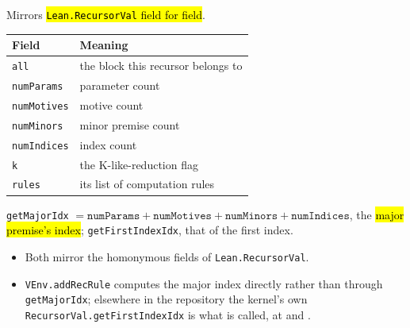 \begin{definition}
\label{struct:vrecursor}
\leanok
{} 

 Mirrors \hl{\texttt{Lean.RecursorVal} field for field}.
\par\smallskip\noindent
\begin{tabular}{ll}
\toprule
Field & Meaning \\
\midrule
\texttt{all} & the block this recursor belongs to \\
\texttt{numParams} & parameter count \\
\texttt{numMotives} & motive count \\
\texttt{numMinors} & minor premise count \\
\texttt{numIndices} & index count \\
\texttt{k} & the K-like-reduction flag \\
\texttt{rules} & its list of computation rules \\
\bottomrule
\end{tabular}\par\smallskip
\end{definition}

\begin{definition}
\label{def:getmajoridx}
\leanok
{} 

 \texttt{getMajorIdx} $= \texttt{numParams}+\texttt{numMotives}+\texttt{numMinors}+\texttt{numIndices}$,
the \hl{major premise's index}; \texttt{getFirstIndexIdx}, that of the first index.
\begin{itemize}
\item Both mirror the homonymous fields of \texttt{Lean.RecursorVal}.
\item \texttt{VEnv.addRecRule}  computes the
major index directly rather than through \texttt{getMajorIdx}; elsewhere in the
repository the kernel's own \texttt{RecursorVal.getFirstIndexIdx} is what is called, at
 and
.
\end{itemize}
\end{definition}


